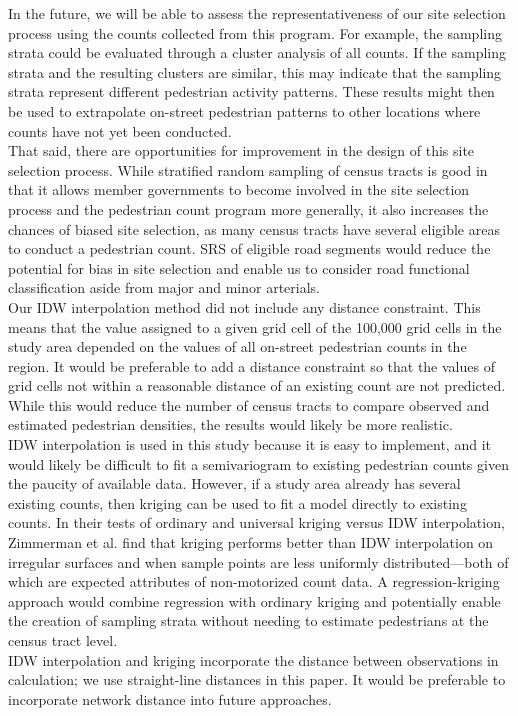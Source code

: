 \documentclass[paper=letterpaper, fontsize=11pt]{scrartcl}
\begin{document}
In the future, we will be able to assess the representativeness of our site selection process using the counts collected from this program. For example, the sampling strata could be evaluated through a cluster analysis of all counts. If the sampling strata and the resulting clusters are similar, this may indicate that the sampling strata represent different pedestrian activity patterns. These results might then be used to extrapolate on-street pedestrian patterns to other locations where counts have not yet been conducted. \\

That said, there are opportunities for improvement in the design of this site selection process. While stratified random sampling of census tracts is good in that it allows member governments to become involved in the site selection process and the pedestrian count program more generally, it also increases the chances of biased site selection, as many census tracts have several eligible areas to conduct a pedestrian count. SRS of eligible road segments would reduce the potential for bias in site selection and enable us to consider road functional classification aside from major and minor arterials. \\

Our IDW interpolation method did not include any distance constraint. This means that the value assigned to a given grid cell of the 100,000 grid cells in the study area depended on the values of all on-street pedestrian counts in the region. It would be preferable to add a distance constraint so that the values of grid cells not within a reasonable distance of an existing count are not predicted. While this would reduce the number of census tracts to compare observed and estimated pedestrian densities, the results would likely be more realistic. \\

IDW interpolation is used in this study because it is easy to implement, and it would likely be difficult to fit a semivariogram to existing pedestrian counts given the paucity of available data. However, if a study area already has several existing counts, then kriging can be used to fit a model directly to existing counts. In their tests of ordinary and universal kriging versus IDW interpolation, Zimmerman et al. find that kriging performs better than IDW interpolation on irregular surfaces and when sample points are less uniformly distributed---both of which are expected attributes of non-motorized count data. A regression-kriging approach would combine regression with ordinary kriging and potentially enable the creation of sampling strata without needing to estimate pedestrians at the census tract level. \\

IDW interpolation and kriging incorporate the distance between observations in calculation; we use straight-line distances in this paper. It would be preferable to incorporate network distance into future approaches.




\end{document}
